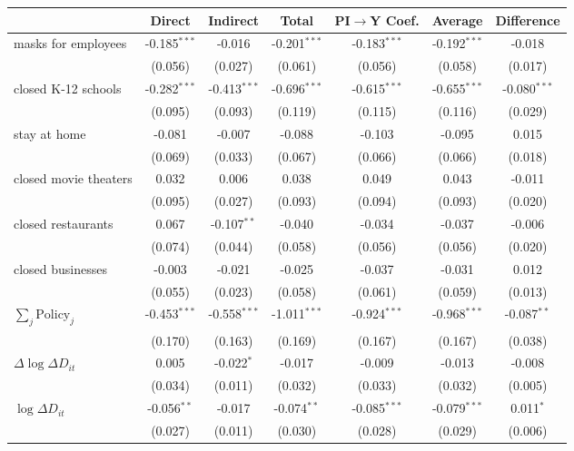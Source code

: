 
\begin{tabular}{lccccc|>{}c}
\toprule
  & Direct & Indirect & Total & PI$\to$Y Coef. & Average & Difference\\
\midrule
masks for employees & -0.185$^{***}$ & -0.016 & -0.201$^{***}$ & -0.183$^{***}$ & -0.192$^{***}$ & -0.018\\
 & (0.056) & (0.027) & (0.061) & (0.056) & (0.058) & (0.017)\\
closed K-12 schools & -0.282$^{***}$ & -0.413$^{***}$ & -0.696$^{***}$ & -0.615$^{***}$ & -0.655$^{***}$ & -0.080$^{***}$\\
 & (0.095) & (0.093) & (0.119) & (0.115) & (0.116) & (0.029)\\
stay at home & -0.081 & -0.007 & -0.088 & -0.103 & -0.095 & 0.015\\
 & (0.069) & (0.033) & (0.067) & (0.066) & (0.066) & (0.018)\\
closed movie theaters & 0.032 & 0.006 & 0.038 & 0.049 & 0.043 & -0.011\\
 & (0.095) & (0.027) & (0.093) & (0.094) & (0.093) & (0.020)\\
closed restaurants & 0.067 & -0.107$^{**}$ & -0.040 & -0.034 & -0.037 & -0.006\\
 & (0.074) & (0.044) & (0.058) & (0.056) & (0.056) & (0.020)\\
closed businesses & -0.003 & -0.021 & -0.025 & -0.037 & -0.031 & 0.012\\
 & (0.055) & (0.023) & (0.058) & (0.061) & (0.059) & (0.013)\\
$\sum_j \mathrm{Policy}_j$ & -0.453$^{***}$ & -0.558$^{***}$ & -1.011$^{***}$ & -0.924$^{***}$ & -0.968$^{***}$ & -0.087$^{**}$\\
 & (0.170) & (0.163) & (0.169) & (0.167) & (0.167) & (0.038)\\
$\Delta \log \Delta D_{it}$ & 0.005 & -0.022$^{*}$ & -0.017 & -0.009 & -0.013 & -0.008\\
 & (0.034) & (0.011) & (0.032) & (0.033) & (0.032) & (0.005)\\
$\log \Delta D_{it}$ & -0.056$^{**}$ & -0.017 & -0.074$^{**}$ & -0.085$^{***}$ & -0.079$^{***}$ & 0.011$^{*}$\\
 & (0.027) & (0.011) & (0.030) & (0.028) & (0.029) & (0.006)\\
\bottomrule
\end{tabular}